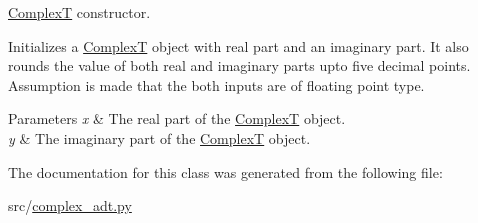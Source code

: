 \hyperlink{classcomplex__adt_1_1_complex_t}{ComplexT} constructor. 

Initializes a \hyperlink{classcomplex__adt_1_1_complex_t}{ComplexT} object with real part and an imaginary part. It also rounds the value of both real and imaginary parts upto five decimal points. Assumption is made that the both inputs are of floating point type. 
\begin{DoxyParams}{Parameters}
{\em x} & The real part of the \hyperlink{classcomplex__adt_1_1_complex_t}{ComplexT} object. \\
\hline
{\em y} & The imaginary part of the \hyperlink{classcomplex__adt_1_1_complex_t}{ComplexT} object. \\
\hline
\end{DoxyParams}


The documentation for this class was generated from the following file\+:\begin{DoxyCompactItemize}
\item 
src/\hyperlink{complex__adt_8py}{complex\+\_\+adt.\+py}\end{DoxyCompactItemize}
